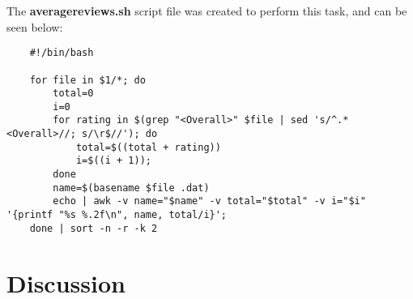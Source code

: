 \documentclass{article}
\begin{document}
	\noindent
	The \textbf{averagereviews.sh} script file was created to perform this task, and can be seen below:
	
	\begin{lstlisting}
	#!/bin/bash

	for file in $1/*; do
		total=0
		i=0
		for rating in $(grep "<Overall>" $file | sed 's/^.*<Overall>//; s/\r$//'); do
			total=$((total + rating))
			i=$((i + 1));
		done
		name=$(basename $file .dat)
		echo | awk -v name="$name" -v total="$total" -v i="$i" '{printf "%s %.2f\n", name, total/i}';
	done | sort -n -r -k 2
	\end{lstlisting}
	
	\section{Discussion}
	
\end{document}
